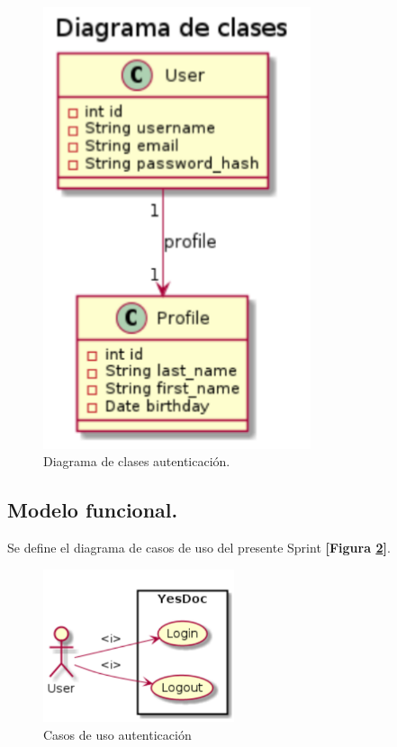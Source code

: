 \documentclass[a4paper,12pt]{article}
\begin{document}
\begin{figure}[h]
        \centering
        \includegraphics[width=0.7\textwidth]{img/clases_auth}
        \caption{Diagrama de clases autenticación.}
		\label{5-clase_autenticacion}
    \end{figure}

\subsection{ Modelo funcional.} 
Se define el diagrama de casos de uso del presente Sprint \textbf{[Figura \ref{4-cu_autenticacion}]}.

    \begin{figure}[h]
        \centering
        \includegraphics[width=0.5\textwidth]{img/cu_autenticacion}
        \caption{Casos de uso autenticación}
		\label{4-cu_autenticacion}
    \end{figure}
\end{document}
